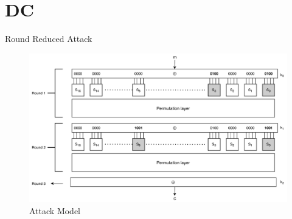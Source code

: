 \section{DC}

\begin{frame}{Round Reduced Attack}
\begin{figure}[H]
        \centering
        \minipage{\textwidth}
        \includegraphics[width=\linewidth]{DC1.pdf}
        \endminipage
        \caption{Attack Model}
    \end{figure}
\end{frame}



